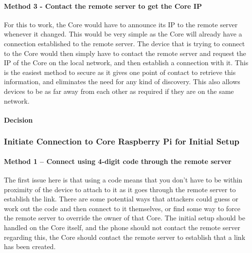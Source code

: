 \documentclass[10pt, a4paper]{article}
\begin{document}
\paragraph{Method 3 - Contact the remote server to get the Core IP} For this to work, the Core would have to announce its IP to the remote server whenever it changed. This would be very simple as the Core will already have a connection established to the remote server. The device that is trying to connect to the Core would then simply have to contact the remote server and request the IP of the Core on the local network, and then establish a connection with it. This is the easiest method to secure as it gives one point of contact to retrieve this information, and eliminates the need for any kind of discovery. This also allows devices to be as far away from each other as required if they are on the same network.

\paragraph{Decision}

\subsubsection{Initiate Connection to Core Raspberry Pi for Initial Setup}

\paragraph{Method 1 – Connect using 4-digit code through the remote server}
The first issue here is that using a code means that you don’t have to be within proximity of the device to attach to it as it goes through the remote server to establish the link. There are some potential ways that attackers could guess or work out the code and then connect to it themselves, or find some way to force the remote server to override the owner of that Core. The initial setup should be handled on the Core itself, and the phone should not contact the remote server regarding this, the Core should contact the remote server to establish that a link has been created.
\end{document}

